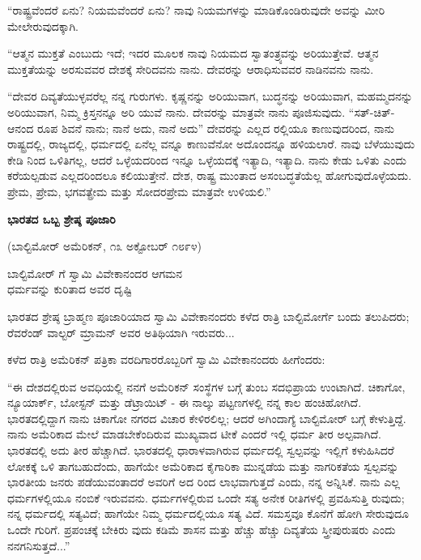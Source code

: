 “ರಾಷ್ಟ್ರವೆಂದರೆ ಏನು? ನಿಯಮವೆಂದರೆ ಏನು? ನಾವು ನಿಯಮಗಳನ್ನು ಮಾಡಿಕೊಂಡಿರುವುದೇ ಅವನ್ನು ಮೀರಿ ಮೇಲೇರುವುದಕ್ಕಾಗಿ.

“ಆತ್ಮನ ಮುಕ್ತತೆ ಎಂಬುದು ಇದೆ; ಇದರ ಮೂಲಕ ನಾವು ನಿಯಮದ ಸ್ವಾತಂತ್ರ್ಯವನ್ನು ಅರಿಯುತ್ತೇವೆ. ಆತ್ಮನ ಮುಕ್ತತೆಯನ್ನು ಅರಸುವವರ ದೇಶಕ್ಕೆ ಸೇರಿದವನು ನಾನು. ದೇವರನ್ನು ಆರಾಧಿಸುವವರ ನಾಡಿನವನು ನಾನು.

“ದೇವರ ದಿವ್ಯತೆಯುಳ್ಳವರೆಲ್ಲ ನನ್ನ ಗುರುಗಳು. ಕೃಷ್ಣನನ್ನು ಅರಿಯುವಾಗ, ಬುದ್ಧನನ್ನು ಅರಿಯುವಾಗ, ಮಹಮ್ಮದನನ್ನು ಅರಿಯುವಾಗ, ನಿಮ್ಮ ಕ್ರಿಸ್ತನನ್ನೂ ಅರಿ ಯುವೆ ನಾನು. ದೇವರನ್ನು ಮಾತ್ರವೇ ನಾನು ಪೂಜಿಸುವುದು. “ಸತ್-ಚಿತ್- ಆನಂದ ರೂಪ ಶಿವನೆ ನಾನು; ನಾನೆ ಅದು, ನಾನೆ ಅದು” ದೇವರನ್ನು ಎಲ್ಲದ ರಲ್ಲಿಯೂ ಕಾಣುವುದರಿಂದ, ನಾನು ರಾಷ್ಟ್ರದಲ್ಲಿ, ರಾಜ್ಯದಲ್ಲಿ, ಧರ್ಮದಲ್ಲಿ ಏನೆಲ್ಲ ವನ್ನೂ ಕಾಣುವೆನೋ ಅದೊಂದನ್ನೂ ಹಳಿಯಲಾರೆ. ನಾವು ಬೆಳೆಯುವುದು ಕೇಡಿ ನಿಂದ ಒಳಿತಿಗಲ್ಲ, ಆದರೆ ಒಳ್ಳೆಯದರಿಂದ ಇನ್ನೂ ಒಳ್ಳೆಯದಕ್ಕೆ ಇತ್ಯಾದಿ, ಇತ್ಯಾದಿ. ನಾನು ಕೇಡು ಒಳಿತು ಎಂದು ಕರೆಯಲ್ಪಡುವ ಎಲ್ಲದರಿಂದಲೂ ಕಲಿಯುತ್ತೇನೆ. ದೇಶ, ರಾಷ್ಟ್ರ ಮುಂತಾದ ಅಸಂಬದ್ಧತೆಯೆಲ್ಲ ಹೋಗುವುದೊಳ್ಳೆಯದು. ಪ್ರೇಮ, ಪ್ರೇಮ, ಭಗವತ್ಪ್ರೇಮ ಮತ್ತು ಸೋದರಪ್ರೇಮ ಮಾತ್ರವೇ ಉಳಿಯಲಿ.”

\begin{center}
\textbf{ಭಾರತದ ಒಬ್ಬ ಶ್ರೇಷ್ಠ ಪೂಜಾರಿ}
\end{center}

\begin{center}
(ಬಾಲ್ಟಿಮೋರ್ ಅಮೆರಿಕನ್, ೧೩ ಅಕ್ಟೋಬರ್ ೧೮೯೪)
\end{center}

\begin{center}
ಬಾಲ್ಟಿಮೋರ್ ಗೆ ಸ್ವಾಮಿ ವಿವೇಕಾನಂದರ ಆಗಮನ\\ಧರ್ಮವನ್ನು ಕುರಿತಾದ ಅವರ ದೃಷ್ಟಿ
\end{center}

ಭಾರತದ ಶ್ರೇಷ್ಠ ಬ್ರಾಹ್ಮಣ ಪೂಜಾರಿಯಾದ ಸ್ವಾಮಿ ವಿವೇಕಾನಂದರು ಕಳೆದ ರಾತ್ರಿ ಬಾಲ್ಟಿಮೋರ್ಗೆ ಬಂದು ತಲುಪಿದರು; ರೆವರೆಂಡ್ ವಾಲ್ಟರ್ ಮ್ರಾಮನ್ ಅವರ ಅತಿಥಿಯಾಗಿ ಇರುವರು...

ಕಳೆದ ರಾತ್ರಿ ಅಮೆರಿಕನ್ ಪತ್ರಿಕಾ ವರದಿಗಾರರೊಬ್ಬರಿಗೆ ಸ್ವಾಮಿ ವಿವೇಕಾನಂದರು ಹೀಗೆಂದರು:

“ಈ ದೇಶದಲ್ಲಿರುವ ಅವಧಿಯಲ್ಲಿ ನನಗೆ ಅಮೆರಿಕನ್ ಸಂಸ್ಥೆಗಳ ಬಗ್ಗೆ ತುಂಬ ಸದಭಿಪ್ರಾಯ ಉಂಟಾಗಿದೆ. ಚಿಕಾಗೋ, ನ್ಯೂಯಾರ್ಕ್, ಬೋಸ್ಟನ್ ಮತ್ತು ಡೆಟ್ರಾಯಿಟ್ - ಈ ನಾಲ್ಕು ಪಟ್ಟಣಗಳಲ್ಲಿ ನನ್ನ ಕಾಲ ಹಂಚಿಹೋಗಿದೆ. ಭಾರತದಲ್ಲಿದ್ದಾಗ ನಾನು ಚಿಕಾಗೋ ನಗರದ ವಿಚಾರ ಕೇಳಿರಲಿಲ್ಲ; ಆದರೆ ಅಗಿಂದಾಗ್ಯೆ ಬಾಲ್ಟಿಮೋರ್ ಬಗ್ಗೆ ಕೇಳುತ್ತಿದ್ದೆ. ನಾನು ಅಮೆರಿಕಾದ ಮೇಲೆ ಮಾಡಬೇಕೆಂದಿರುವ ಮುಖ್ಯವಾದ ಟೀಕೆ ಎಂದರೆ ಇಲ್ಲಿ ಧರ್ಮ ತೀರ ಅಲ್ಪವಾಗಿದೆ. ಭಾರತದಲ್ಲಿ ಅದು ತೀರ ಹೆಚ್ಚಾಗಿದೆ. ಭಾರತದಲ್ಲಿ ಧಾರಾಳವಾಗಿರುವ ಧರ್ಮದಲ್ಲಿ ಸ್ವಲ್ಪವನ್ನು ಇಲ್ಲಿಗೆ ಕಳುಹಿಸಿದರೆ ಲೋಕಕ್ಕೆ ಒಳಿ ತಾಗಬಹುದೆಂದು, ಹಾಗೆಯೇ ಅಮೆರಿಕಾದ ಕೈಗಾರಿಕಾ ಮುನ್ನಡೆಯ ಮತ್ತು ನಾಗರಿಕತೆಯ ಸ್ವಲ್ಪವನ್ನು ಭಾರತೀಯ ಜನರು ಪಡೆಯುವಂತಾದರೆ ಅವರಿಗೆ ಅದ ರಿಂದ ಲಾಭವಾಗುತ್ತದೆ ಎಂದು, ನನ್ನ ಅನ್ನಿಸಿಕೆ. ನಾನು ಎಲ್ಲ ಧರ್ಮಗಳಲ್ಲಿಯೂ ನಂಬಿಕೆ ಇರುವವನು. ಧರ್ಮಗಳಲ್ಲಿರುವ ಒಂದೇ ಸತ್ಯ ಅನೇಕ ರೀತಿಗಳಲ್ಲಿ ಪ್ರವಹಿಸುತ್ತಿ ರುವುದು; ನನ್ನ ಧರ್ಮದಲ್ಲಿ ಸತ್ಯವಿದೆ; ಹಾಗೆಯೇ ನಿಮ್ಮ ಧರ್ಮದಲ್ಲಿಯೂ ಸತ್ಯ ವಿದೆ. ಸಮಸ್ತವೂ ಕೊನೆಗೆ ಹೋಗಿ ಸೇರುವುದೂ ಒಂದೇ ಗುರಿಗೆ. ಪ್ರಪಂಚಕ್ಕೆ ಬೇಕಿರು ವುದು ಕಡಿಮೆ ಶಾಸನ ಮತ್ತು ಹೆಚ್ಚು ಹೆಚ್ಚು ದಿವ್ಯತೆಯ ಸ್ತ್ರೀಪುರುಷರು ಎಂದು ನನಗನಿಸುತ್ತದೆ...”

